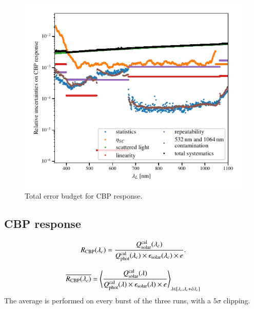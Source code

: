 \begin{figure}[h]
    \centering
    \includegraphics[width=\columnwidth]{fig/cbp_error_budget.pdf}
    \caption{Total error budget for CBP response.}
    \label{fig:cbp_budget}
\end{figure}

\subsection{CBP response}


\begin{equation}
    R_{\mathrm{CBP}}(\lambda_c) = \frac{Q_{\mathrm{solar}}^{\rm cal}(\lambda_c)}{Q_{\mathrm{phot}}^{\rm cal}(\lambda_c) \times \epsilon_{\mathrm{solar}}(\lambda_c) \times e}.
    \label{eq:rcbp2}
\end{equation} 

\begin{equation}
    \overline{R_{\mathrm{CBP}}(\lambda_c)} = \left\langle\frac{Q_{\mathrm{solar}}^{\rm cal}(\lambda)}{Q_{\mathrm{phot}}^{\rm cal}(\lambda) \times \epsilon_{\mathrm{solar}}(\lambda) \times e}\right\rangle_{\lambda\in [\lambda_c,\lambda_c+\delta \lambda_c]}
    \label{eq:rcbp3}
\end{equation} 
The average is performed on every burst of the three runs, with a $5\sigma$ clipping.


